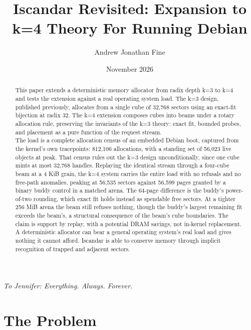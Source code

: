 \documentclass{article}
\title{Iscandar Revisited: Expansion to k=4 Theory For Running Debian}
\author{Andrew Jonathan Fine}
\date{November 2026}
\begin{document}
\maketitle

\begin{abstract}
This paper extends a deterministic memory allocator from radix depth k=3 to k=4 and tests the extension against a real operating system load. The k=3 design, published previously, allocates from a single cube of 32,768 sectors using an exact-fit bijection at radix 32. The k=4 extension composes cubes into beams under a rotary allocation rule, preserving the invariants of the k=3 theory: exact fit, bounded probes, and placement as a pure function of the request stream.\\

The load is a complete allocation census of an embedded Debian boot, captured from the kernel's own tracepoints: 812,106 allocations, with a standing set of 56,023 live objects at peak. That census rules out the k=3 design unconditionally, since one cube mints at most 32,768 handles. Replaying the identical stream through a four-cube beam at a 4 KiB grain, the k=4 system carries the entire load with no refusals and no free-path anomalies, peaking at 56,535 sectors against 56,599 pages granted by a binary buddy control in a matched arena. The 64-page difference is the buddy's power-of-two rounding, which exact fit holds instead as spendable free sectors. At a tighter 256 MiB arena the beam still refuses nothing, though the buddy's largest remaining fit exceeds the beam's, a structural consequence of the beam's cube boundaries. The claim is support by replay, with a potential DRAM savings, not in-kernel replacement.\\

A deterministic allocator can bear a general operating system's real load and gives nothing it cannot afford. Iscandar is able to conserve memory through implicit recognition of trapped and adjacent sectors.\\
\end{abstract}

\clearpage
\thispagestyle{empty}
\vspace*{\fill}
\begin{center}
\itshape To Jennifer: Everything. Always. Forever.
\end{center}
\vspace*{\fill}
\clearpage

\section{The Problem}
\end{document}
